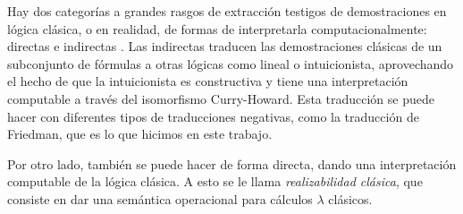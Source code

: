 Hay dos categorías a grandes rasgos de extracción testigos de demostraciones en lógica clásica, o en realidad, de formas de interpretarla computacionalmente: directas e indirectas \cite{miquel-friedman}. Las indirectas traducen las demostraciones clásicas de un subconjunto de fórmulas a otras lógicas como lineal o intuicionista, aprovechando el hecho de que la intuicionista es constructiva y tiene una interpretación computable a través del isomorfismo Curry-Howard. Esta traducción se puede hacer con diferentes tipos de traducciones negativas, como la traducción de Friedman, que es lo que hicimos en este trabajo.

Por otro lado, también se puede hacer de forma directa, dando una interpretación computable de la lógica clásica. A esto se le llama \textit{realizabilidad clásica}, que consiste en dar una semántica operacional para cálculos $\lambda$ clásicos.